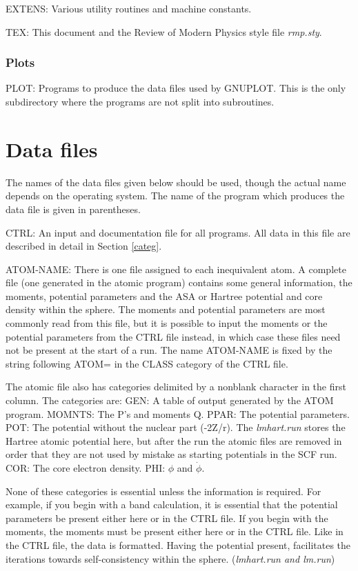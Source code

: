 \documentclass[aps,twocolumn,a4]{revtex4}
\begin{document}
EXTENS: Various utility routines and machine constants.

TEX: This document and the Review of Modern Physics style file
{\em rmp.sty}.

\subsubsection{Plots}

PLOT: Programs to produce the data files used by GNUPLOT. This is the
only subdirectory where the programs are not split into subroutines.

%
\section{Data files}
\label{data}

The names of the data files given below should be used,
though the actual name depends on the operating system.
The name of the program which produces the data file is given in
parentheses.

CTRL: An input and documentation file for all programs.
All data in this file are described in detail in Section \ref{categ}.

ATOM-NAME: There is one file assigned to each inequivalent atom.  A
complete file (one generated in the atomic program) contains some
general
information, the moments, potential parameters and the ASA or Hartree
potential and core density within the sphere.  The moments and potential
parameters are most commonly read from this file, but it is possible to
input the moments or the potential parameters
from the CTRL file instead, in which case these
files need not be present at the start of a run. The name ATOM-NAME is
fixed by the string following ATOM= in the CLASS category of the CTRL
file.

The atomic file also has categories delimited by a nonblank character
in the first column.  The categories are: GEN: A table of output
generated by the ATOM program. MOMNTS: The P's and moments Q. PPAR: The
potential parameters.  POT: The potential without the nuclear part
(-2Z/r).
The {\em lmhart.run} stores the Hartree atomic potential here, but after
the run the atomic files are removed in order that they are not used
by mistake as starting potentials in the SCF run.
COR: The core electron density. PHI: $\phi $ and $\dot \phi $.

None of these categories is essential unless the information is
required.  For example, if you begin with a band calculation, it is
essential that the potential parameters be present either here or in the
CTRL file.
If you begin with
the moments, the moments must be present either here or in the CTRL
file.  Like in the CTRL file, the data is formatted.  Having the
potential present, facilitates the iterations towards
self-consistency within the sphere.
({\em lmhart.run and lm.run})
\end{document}
